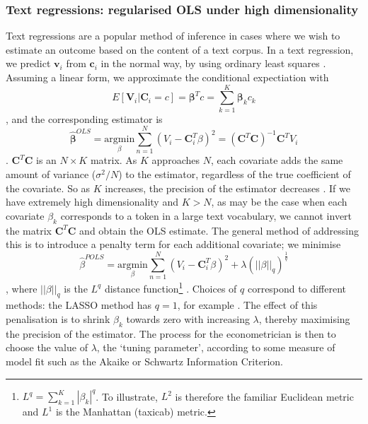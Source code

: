 \documentclass{article}
\begin{document}
\subsubsection{Text regressions: regularised OLS under high dimensionality}
Text regressions are a popular method of inference in cases where we wish to estimate an outcome based on the content of a text corpus.  In a text regression, we predict \(\mathbf{v}_i\) from \(\mathbf{c}_i\) in the normal way, by using ordinary least squares \parencite[541]{gentzkowTextData2019}. Assuming a linear form, we approximate the conditional expectiation with
\[
    E[\mathbf{V}_i | \mathbf{C}_i = c] = \mathbf{\beta}^T c = \sum^K_{k=1} \mathbf{\beta}_k c_k
\]
, and the corresponding estimator is 
\[ 
    \hat{\mathbf{\beta}}^{OLS} = \underset{\beta}{\mathrm{argmin }} \sum^N_{n=1} (V_i - \mathbf{C}_i^T \beta)^2 = (\mathbf{C}^T \mathbf{C})^{-1}\mathbf{C}^T V_i
\]. \(\mathbf{C}^T \mathbf{C}\) is an \(N \times K\) matrix. As \(K\) approaches \(N\), each covariate adds the same amount of variance (\(\sigma^2 / N\)) to the estimator, regardless of the true coefficient of the covariate. So as \(K\) increases, the precision of the estimator decreases \parencite[101]{davidsonEconometricTheoryMethods2004}. If we have extremely high dimensionality and \(K > N\), as may be the case when each covariate \(\beta_k\) corresponds to a token in a large text vocabulary, we cannot invert the matrix \(\mathbf{C}^T \mathbf{C}\) and obtain the OLS estimate. The general method of addressing this is to introduce a penalty term for each additional covariate; we minimise 
\[
    \hat{\beta}^{POLS} = \underset{\beta}{\mathrm{argmin }} \sum^N_{n=1} (V_i - \mathbf{C}_i^T \beta)^2  + \lambda (||\beta||_q)^{\frac{1}{q}}
\], where \(||\beta||_q\) is the  \(L^q\) distance function\footnote{\(L^q = \sum^K_{k=1}|\beta_k|^q\). To illustrate, \(L^2\) is therefore the familiar Euclidean metric and \(L^1\) is the Manhattan (taxicab) metric.} \parencite[696]{atheyMachineLearningMethods2019a}. Choices of \(q\) correspond to different methods: the LASSO method has \(q =1\), for example \parencite{tibshiraniRegressionShrinkageSelection1996}.  The effect of this penalisation is to shrink \(\beta_k\) towards zero with increasing \(\lambda\), thereby maximising the precision of the estimator. The process for the econometrician is then to choose the value of \(\lambda\), the `tuning parameter', according to some measure of model fit such as the Akaike or Schwartz Information Criterion.    
\end{document}
